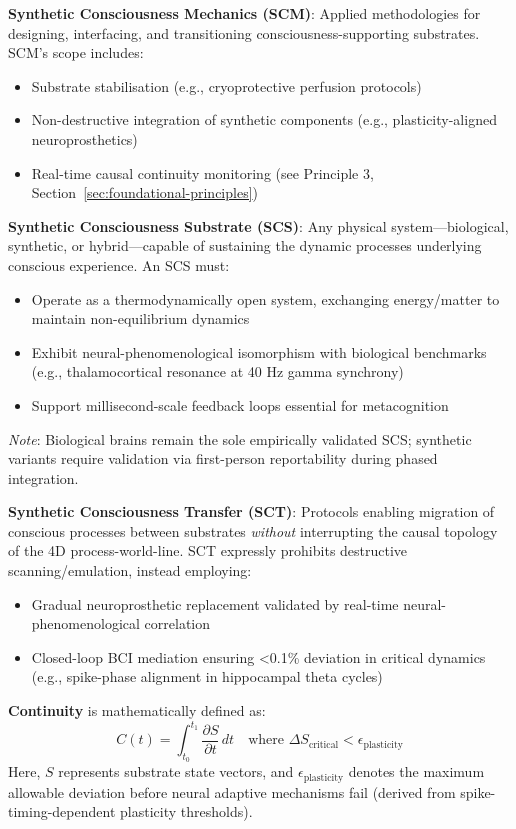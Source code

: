 \documentclass[10pt]{article}
\begin{document}
\begin{sloppypar}
  \textbf{Synthetic Consciousness Mechanics (SCM)}: Applied methodologies for designing, interfacing, and transitioning consciousness-supporting substrates. SCM’s scope includes:
  \begin{itemize}
    \item Substrate stabilisation (e.g., cryoprotective perfusion protocols)
    \item Non-destructive integration of synthetic components (e.g., plasticity-aligned neuroprosthetics)
    \item Real-time causal continuity monitoring (see Principle 3, Section~\ref{sec:foundational-principles})
  \end{itemize}

  \textbf{Synthetic Consciousness Substrate (SCS)}: Any physical system—biological, synthetic, or hybrid—capable of sustaining the dynamic processes underlying conscious experience. An SCS must:
  \begin{itemize}
    \item Operate as a thermodynamically open system, exchanging energy/matter to maintain non-equilibrium dynamics
    \item Exhibit neural-phenomenological isomorphism with biological benchmarks (e.g., thalamocortical resonance at 40 Hz gamma synchrony)
    \item Support millisecond-scale feedback loops essential for metacognition
  \end{itemize}
  \textit{Note}: Biological brains remain the sole empirically validated SCS; synthetic variants require validation via first-person reportability during phased integration.

  \textbf{Synthetic Consciousness Transfer (SCT)}: Protocols enabling migration of conscious processes between substrates \textit{without} interrupting the causal topology of the 4D process-world-line. SCT expressly prohibits destructive scanning/emulation, instead employing:
  \begin{itemize}
    \item Gradual neuroprosthetic replacement validated by real-time neural-phenomenological correlation
    \item Closed-loop BCI mediation ensuring <0.1\% deviation in critical dynamics (e.g., spike-phase alignment in hippocampal theta cycles)
  \end{itemize}
  \textbf{Continuity} is mathematically defined as:
  \begin{equation}
    C(t) = \int_{t_0}^{t_1} \frac{\partial S}{\partial t} \, dt \quad \text{where } \Delta S_{\text{critical}} < \epsilon_{\text{plasticity}}
  \end{equation}
  Here, \( S \) represents substrate state vectors, and \( \epsilon_{\text{plasticity}} \) denotes the maximum allowable deviation before neural adaptive mechanisms fail (derived from spike-timing-dependent plasticity thresholds).


\end{sloppypar}
\end{document}
